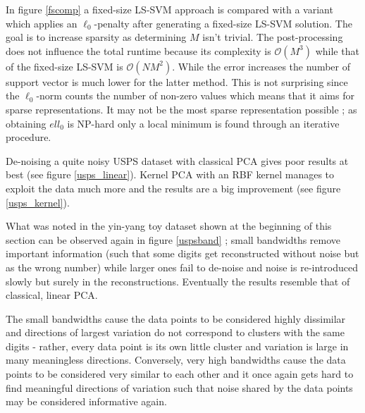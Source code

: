 \par In figure \ref{fscomp} a fixed-size LS-SVM approach is compared with a variant which applies an $\ell_0$-penalty after generating a fixed-size LS-SVM solution. The goal is to increase sparsity as determining $M$ isn't trivial. The post-processing does not influence the total runtime because its complexity is $\mathcal{O}(M^3)$ while that of the fixed-size LS-SVM is $\mathcal{O}(NM^2)$. While the error increases the number of support vector is much lower for the latter method. This is not surprising since the $\ell_0$-norm counts the number of non-zero values which means that it aims for sparse representations. It may not be the most sparse representation possible ; as obtaining $ell_0$ is NP-hard only a local minimum is found through an iterative procedure.


De-noising a quite noisy USPS dataset with classical PCA gives poor results at best (see figure \ref{usps_linear}). Kernel PCA with an RBF kernel manages to exploit the data much more and the results are a big improvement (see figure \ref{usps_kernel}).

\endgroup

What was noted in the yin-yang toy dataset shown at the beginning of this section can be observed again in figure \ref{uspsband} ; small bandwidths remove important information (such that some digits get reconstructed without noise but as the wrong number) while larger ones fail to de-noise and noise is re-introduced slowly but surely in the reconstructions. Eventually the results resemble that of classical, linear PCA.

\par The small bandwidths cause the data points to be considered highly dissimilar and directions of largest variation do not correspond to clusters with the same digits - rather, every data point is its own little cluster and variation is large in many meaningless directions. Conversely, very high bandwidths cause the data points to be considered very similar to each other and it once again gets hard to find meaningful directions of variation such that noise shared by the data points may be considered informative again.


